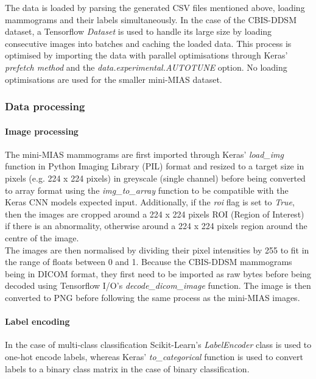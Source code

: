 The data is loaded by parsing the generated CSV files mentioned above, loading mammograms and their labels simultaneously. In the case of the CBIS-DDSM dataset, a Tensorflow \textit{Dataset} is used to handle its large size by loading consecutive images into batches and caching the loaded data. This process is optimised by importing the data with parallel optimisations through Keras' \textit{prefetch method} and the \textit{data.experimental.AUTOTUNE} option. No loading optimisations are used for the smaller mini-MIAS dataset.\\


\subsubsection{Data processing}

\paragraph{Image processing} The mini-MIAS mammograms are first imported through Keras' \textit{load\_img} function in Python Imaging Library (PIL) format and resized to a target size in pixels (e.g. 224 x 224 pixels) in greyscale (single channel) before being converted to array format using the \textit{img\_to\_array} function to be compatible with the Keras CNN models expected input. Additionally, if the \textit{roi} flag is set to \textit{True}, then the images are cropped around a 224 x 224 pixels ROI (Region of Interest) if there is an abnormality, otherwise around a 224 x 224 pixels region around the centre of the image.\\

The images are then normalised by dividing their pixel intensities by 255 to fit in the range of floats between 0 and 1. Because the CBIS-DDSM mammograms being in DICOM format, they first need to be imported as raw bytes before being decoded using Tensorflow I/O's \textit{decode\_dicom\_image} function. The image is then converted to PNG before following the same process as the mini-MIAS images.

\paragraph{Label encoding}

In the case of multi-class classification Scikit-Learn's \textit{LabelEncoder} class is used to one-hot encode labels, whereas Keras' \textit{to\_categorical} function is used to convert labels to a binary class matrix in the case of binary classification.

